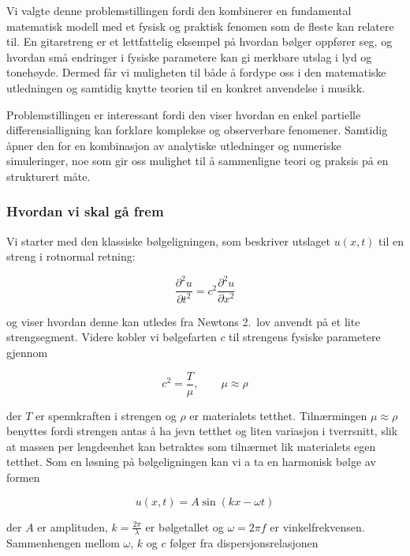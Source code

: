 Vi valgte denne problemstillingen fordi den kombinerer en fundamental matematisk modell 
med et fysisk og praktisk fenomen som de fleste kan relatere til. En gitarstreng er et lettfattelig
eksempel på hvordan bølger oppfører seg, og hvordan små endringer i fysiske parametere kan gi 
merkbare utslag i lyd og tonehøyde. Dermed får vi muligheten til både å fordype oss i 
den matematiske utledningen og samtidig knytte teorien til en konkret anvendelse i musikk.

Problemstillingen er interessant fordi den viser hvordan en enkel partielle differensialligning 
kan forklare komplekse og observerbare fenomener. Samtidig åpner den for en kombinasjon 
av analytiske utledninger og numeriske simuleringer, noe som gir oss mulighet til å sammenligne 
teori og praksis på en strukturert måte.

\subsubsection*{Hvordan vi skal gå frem}

Vi starter med den klassiske bølgeligningen, som beskriver utslaget $u(x,t)$ til en streng i rotnormal retning:

\begin{equation*}
  \frac{\partial^2 u}{\partial t^2} = c^2 \frac{\partial^2 u}{\partial x^2}
  \label{eq:bolgeligningen}
\end{equation*}

og viser hvordan denne kan utledes fra Newtons 2.~lov anvendt på et lite strengsegment.
Videre kobler vi bølgefarten $c$ til strengens fysiske parametere gjennom

\begin{equation}
  c^2 = \frac{T}{\mu}, \qquad \mu \approx \rho \label{eq:bølgefart}
\end{equation}

der $T$ er spennkraften i strengen og $\rho$ er materialets tetthet. 
Tilnærmingen $\mu \approx \rho$ benyttes fordi strengen antas å ha jevn tetthet og liten variasjon i tverrsnitt, slik at massen per lengdeenhet kan betraktes som tilnærmet lik materialets egen tetthet.
Som en løsning på bølgeligningen kan vi a ta en harmonisk bølge av formen

\begin{equation*}
  u(x,t) = A \sin(kx - \omega t)
\end{equation*}

der $A$ er amplituden, $k=\tfrac{2\pi}{\lambda}$ er bølgetallet og $\omega = 2\pi f$ er vinkelfrekvensen.  
Sammenhengen mellom $\omega$, $k$ og $c$ følger fra dispersjonsrelasjonen

